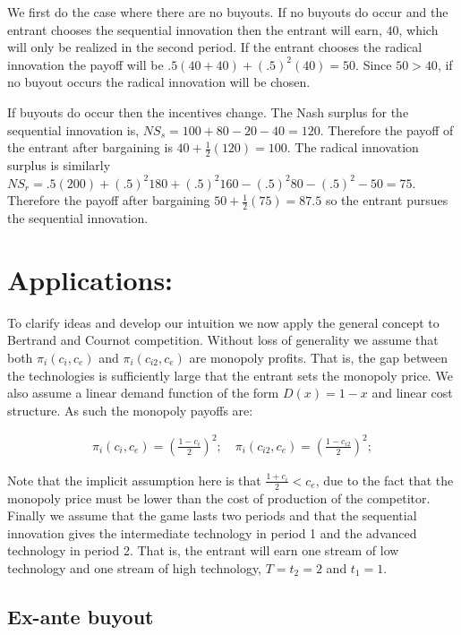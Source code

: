 We first do the case where there are no buyouts. If no buyouts do occur and the entrant chooses the sequential innovation then the entrant will earn, $40$, which will only be realized in the second period. If the entrant chooses the radical innovation the payoff will be $.5(40+40)+(.5)^2(40)=50$. Since $50>40$, if no buyout occurs the radical innovation will be chosen. 

If buyouts do occur then the incentives change. The Nash surplus for the sequential innovation is, $NS_s = 100+80-20-40=120$. Therefore the payoff of the entrant after bargaining is $40+\frac{1}{2}(120)=100$. The radical innovation surplus is similarly $NS_r = .5(200)+(.5)^2 180+(.5)^2 160-(.5)^2 80-(.5)^2-50=75$. Therefore the payoff after bargaining $50+\frac{1}{2}(75)=87.5$ so the entrant pursues the sequential innovation. 

\section{Applications:}\label{application}

To clarify ideas and develop our intuition we now apply the general concept to Bertrand and Cournot competition. Without loss of generality we assume that both $\pi_i(c_i,c_e)$ and
$\pi_i(c_{i2},c_e)$ are monopoly profits. That is, the gap between the technologies is sufficiently large that the entrant sets the monopoly price. We also assume a linear demand function of the form $D(x)=1-x$ and linear cost structure.  As such the monopoly payoffs are: 

\begin{align*}
\pi_i(c_i,c_e) = 
\left(\frac{1-c_i}{2}\right)^2; \quad \pi_i(c_{i2},c_e) = \left(\frac{1-c_{i2}}{2}\right)^2;  
\end{align*}

Note that the implicit assumption here is that $\frac{1+c_i}{2}<c_e$, due to the fact that the monopoly price must be lower than the cost of production of the competitor. Finally we assume that the game lasts two periods and that the sequential innovation gives the intermediate technology in period 1 and the advanced technology in period 2. That is, the entrant will earn one stream of low technology and one stream of high technology, $T=t_2=2$ and $t_1=1$.

\subsection{Ex-ante buyout}

